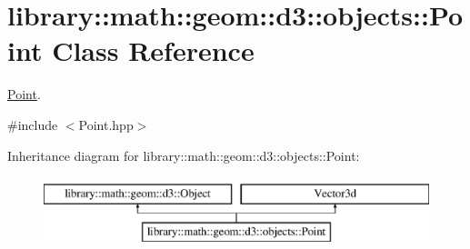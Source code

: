 \hypertarget{classlibrary_1_1math_1_1geom_1_1d3_1_1objects_1_1_point}{}\section{library\+:\+:math\+:\+:geom\+:\+:d3\+:\+:objects\+:\+:Point Class Reference}
\label{classlibrary_1_1math_1_1geom_1_1d3_1_1objects_1_1_point}


\hyperlink{classlibrary_1_1math_1_1geom_1_1d3_1_1objects_1_1_point}{Point}.  




{\ttfamily \#include $<$Point.\+hpp$>$}

Inheritance diagram for library\+:\+:math\+:\+:geom\+:\+:d3\+:\+:objects\+:\+:Point\+:\begin{figure}[H]
\begin{center}
\leavevmode
\includegraphics[height=2.000000cm]{classlibrary_1_1math_1_1geom_1_1d3_1_1objects_1_1_point}
\end{center}
\end{figure}
